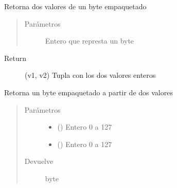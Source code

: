 \documentclass[a4paper,12pt,spanish]{sphinxmanual}
\begin{document}

\begin{fulllineitems}
\label{\detokenize{openerm.Utils:openerm.Utils.get_values_from_byte}}
Retorna dos valores de un byte empaquetado
\begin{quote}\begin{description}
\item[{Parámetros}] \leavevmode
{} \textendash{} Entero que represta un byte

\end{description}\end{quote}
\begin{description}
\item[{Return}] \leavevmode
(v1, v2) Tupla con los dos valores enteros

\end{description}

\end{fulllineitems}


\begin{fulllineitems}
\label{\detokenize{openerm.Utils:openerm.Utils.set_byte_from_values}}
Retorna un byte empaquetado a partir de dos valores
\begin{quote}\begin{description}
\item[{Parámetros}] \leavevmode\begin{itemize}
\item {} 
 () \textendash{} Entero 0 a 127

\item {} 
 () \textendash{} Entero 0 a 127

\end{itemize}

\item[{Devuelve}] \leavevmode
byte

\end{description}\end{quote}

\end{fulllineitems}
\end{document}
